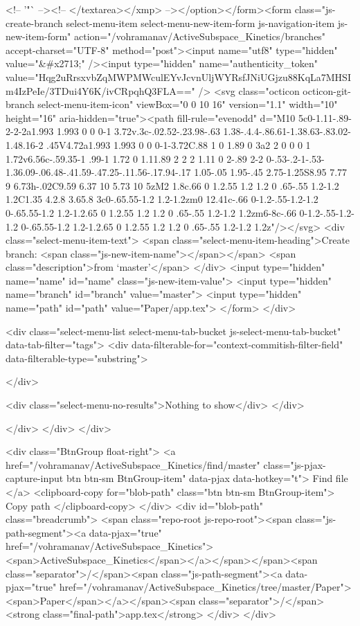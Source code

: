           <!-- '"` --><!-- </textarea></xmp> --></option></form><form class="js-create-branch select-menu-item select-menu-new-item-form js-navigation-item js-new-item-form" action="/vohramanav/ActiveSubspace_Kinetics/branches" accept-charset="UTF-8" method="post"><input name="utf8" type="hidden" value="&#x2713;" /><input type="hidden" name="authenticity_token" value="Hqg2uRrsxvbZqMWPMWculEYvJcvnUljWYRsfJNiUGjzu88KqLa7MHSIm4IzPeIe/3TDui4Y6K/ivCRpqhQ3FLA==" />
          <svg class="octicon octicon-git-branch select-menu-item-icon" viewBox="0 0 10 16" version="1.1" width="10" height="16" aria-hidden="true"><path fill-rule="evenodd" d="M10 5c0-1.11-.89-2-2-2a1.993 1.993 0 0 0-1 3.72v.3c-.02.52-.23.98-.63 1.38-.4.4-.86.61-1.38.63-.83.02-1.48.16-2 .45V4.72a1.993 1.993 0 0 0-1-3.72C.88 1 0 1.89 0 3a2 2 0 0 0 1 1.72v6.56c-.59.35-1 .99-1 1.72 0 1.11.89 2 2 2 1.11 0 2-.89 2-2 0-.53-.2-1-.53-1.36.09-.06.48-.41.59-.47.25-.11.56-.17.94-.17 1.05-.05 1.95-.45 2.75-1.25S8.95 7.77 9 6.73h-.02C9.59 6.37 10 5.73 10 5zM2 1.8c.66 0 1.2.55 1.2 1.2 0 .65-.55 1.2-1.2 1.2C1.35 4.2.8 3.65.8 3c0-.65.55-1.2 1.2-1.2zm0 12.41c-.66 0-1.2-.55-1.2-1.2 0-.65.55-1.2 1.2-1.2.65 0 1.2.55 1.2 1.2 0 .65-.55 1.2-1.2 1.2zm6-8c-.66 0-1.2-.55-1.2-1.2 0-.65.55-1.2 1.2-1.2.65 0 1.2.55 1.2 1.2 0 .65-.55 1.2-1.2 1.2z"/></svg>
            <div class="select-menu-item-text">
              <span class="select-menu-item-heading">Create branch: <span class="js-new-item-name"></span></span>
              <span class="description">from ‘master’</span>
            </div>
            <input type="hidden" name="name" id="name" class="js-new-item-value">
            <input type="hidden" name="branch" id="branch" value="master">
            <input type="hidden" name="path" id="path" value="Paper/app.tex">
</form>
      </div>

      <div class="select-menu-list select-menu-tab-bucket js-select-menu-tab-bucket" data-tab-filter="tags">
        <div data-filterable-for="context-commitish-filter-field" data-filterable-type="substring">


        </div>

        <div class="select-menu-no-results">Nothing to show</div>
      </div>

    </div>
  </div>
</div>

    <div class="BtnGroup float-right">
      <a href="/vohramanav/ActiveSubspace_Kinetics/find/master"
            class="js-pjax-capture-input btn btn-sm BtnGroup-item"
            data-pjax
            data-hotkey="t">
        Find file
      </a>
      <clipboard-copy for="blob-path" class="btn btn-sm BtnGroup-item">
        Copy path
      </clipboard-copy>
    </div>
    <div id="blob-path" class="breadcrumb">
      <span class="repo-root js-repo-root"><span class="js-path-segment"><a data-pjax="true" href="/vohramanav/ActiveSubspace_Kinetics"><span>ActiveSubspace_Kinetics</span></a></span></span><span class="separator">/</span><span class="js-path-segment"><a data-pjax="true" href="/vohramanav/ActiveSubspace_Kinetics/tree/master/Paper"><span>Paper</span></a></span><span class="separator">/</span><strong class="final-path">app.tex</strong>
    </div>
  </div>


